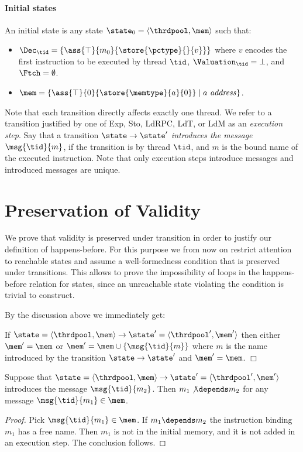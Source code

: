 \paragraph{Initial states}
An initial state is any state $\state_0 = \langle \thrdpool,\mem\rangle$ such that:
\begin{itemize}
\item $\Dec_\tid=\{\ass{\top}{m_0}{\store{\pctype}{}{v}} \}$ where $v$ encodes the first instruction to be executed by thread $\tid$, $\Valuation_\tid = \bot$, and $\Ftch = \emptyset$.
\item $\mem = \{ \ass{\top}{0}{\store{\memtype}{a}{0}} \mid a\ \mathit{address} \}$.
\end{itemize}
%
Note that each transition directly affects exactly one thread.
We refer to a transition justified by one of {\sc Exp}, {\sc Sto}, {\sc LdRPC}, {\sc LdT}, or {\sc LdM} as an \emph{execution step}.
Say that a transition $\state\rightarrow\state'$ \emph{introduces the message} $\msg{\tid}{m}$, if the transition is by thread $\tid$, and $m$ is the bound name of the executed instruction. Note that only execution steps introduce messages and introduced messages are unique.

\section{Preservation of Validity}

We prove that validity is preserved under transition in order to justify our definition of happens-before. For this purpose we from now on restrict attention to reachable states and assume a well-formedness condition that is preserved under transitions. This allows to prove the impossibility of loops in the happens-before relation for states, since an unreachable state violating the condition is trivial to construct. 

By the discussion above we immediately get:

\begin{proposition}
\label{prop:introducing}
If $\state=\langle\thrdpool,\mem\rangle\rightarrow\state'=\langle\thrdpool',\mem'\rangle$ then either $\mem'=\mem$ or $\mem'= \mem\cup \{\msg{\tid}{m}\}$ where
$m$ is the name introduced by the transition $\state\rightarrow\state'$ and $\mem'=\mem$. \hfill $\Box$
\end{proposition}

\begin{proposition}
\label{prop:depends}
Suppose that $\state=\langle\thrdpool,\mem\rangle\rightarrow\state'=\langle\thrdpool',\mem'\rangle$ introduces the message $\msg{\tid}{m_2}$. Then
$m_1\not\depends m_2$ for any message  $\msg{\tid}{m_1}\in\mem$.
\end{proposition}
\begin{proof}
Pick $\msg{\tid}{m_1}\in\mem$. If $m_1\depends m_2$ the instruction
binding $m_1$ has a free name. Then $m_1$ is not in the initial memory, and it is not added in an execution step. The conclusion follows.
\end{proof}

